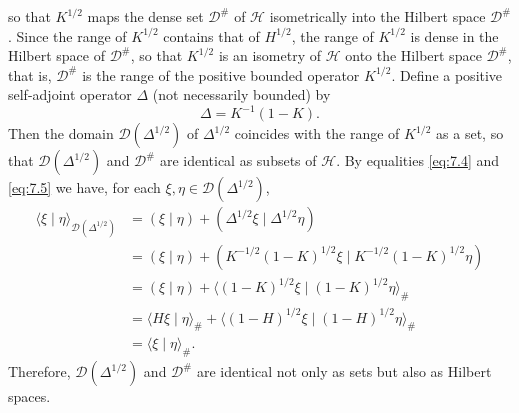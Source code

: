 \documentclass[12pt,b5paper,twoside]{article}
\theoremstyle{takesaki}
\numberwithin{equation}{section}
\begin{document}
so that $K^{1/2}$ maps the dense set $\mathcal D^\#$ of $\mathcal H$
isometrically into the Hilbert space $\mathcal D^\#$.  Since the range
of $K^{1/2}$ contains that of $H^{1/2}$, the range of $K^{1/2}$ is dense
in the Hilbert space of $\mathcal D^\#$, so that $K^{1/2}$ is an
isometry of $\mathcal H$ onto the Hilbert space $\mathcal D^\#$, that
is, $\mathcal D^\#$ is the range of the positive bounded operator
$K^{1/2}$.  Define a positive self-adjoint operator $\Delta$ (not
necessarily bounded) by
\begin{equation}
 \Delta=K^{-1}(1-K).
 \tag{7.6}\label{eq:7.6}
\end{equation}
Then the domain $\mathcal D(\Delta^{1/2})$ of $\Delta^{1/2}$ coincides
with the range of $K^{1/2}$
as a set, so that $\mathcal D(\Delta^{1/2})$ and $\mathcal D^\#$ are
identical as subsets of $\mathcal H$.  By equalities \eqref{eq:7.4} and
\eqref{eq:7.5} we have, for each
$\xi,\eta\in\mathcal D(\Delta^{1/2})$,
\begin{align*}
 \langle\xi\mid\eta\rangle_{\mathcal D(\Delta^{1/2})}
  &=(\xi\mid\eta)+(\Delta^{1/2}\xi\mid\Delta^{1/2}\eta)\\
  &=(\xi\mid\eta)
    +(K^{-1/2}(1-K)^{1/2}\xi
      \mid K^{-1/2}(1-K)^{1/2}\eta)\\
  &=(\xi\mid\eta)
    +\langle(1-K)^{1/2}\xi\mid(1-K)^{1/2}\eta\rangle_\#\\
  &=\langle H\xi\mid\eta\rangle_\#
    +\langle(1-H)^{1/2}\xi\mid(1-H)^{1/2}\eta\rangle_\#\\
  &=\langle\xi\mid\eta\rangle_\#.
\end{align*}
Therefore, $\mathcal D(\Delta^{1/2})$ and $\mathcal D^\#$ are identical
not only as sets but also as Hilbert spaces.
\end{document}
